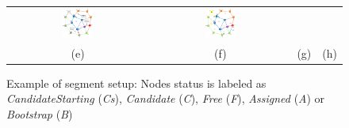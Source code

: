 \begin{figure}
\begin{tabular}{cccc}
\includegraphics[width=0.23\textwidth]{pictures/seq07.eps} & 
\includegraphics[width=0.23\textwidth]{pictures/seq08.eps} \\
(e) & (f) & (g) & (h) \\
\end{tabular}
\caption{Example of \disr{} segment setup: Nodes status is labeled as \emph{CandidateStarting} (\emph{Cs}), \emph{Candidate} (\emph{C}), \emph{Free} (\emph{F}), \emph{Assigned} (\emph{A}) or \emph{Bootstrap} (\emph{B})}
\label{fig:disr_events}
\end{figure}

